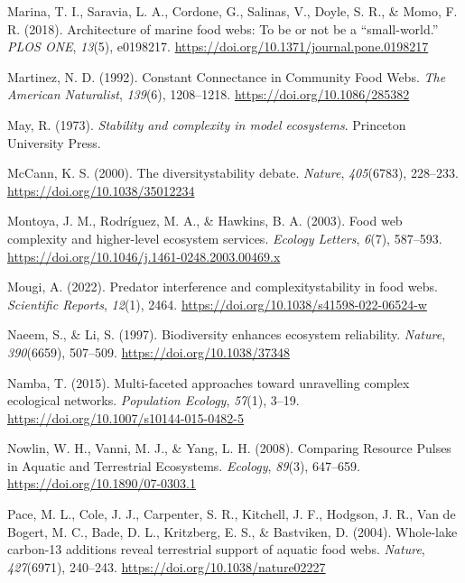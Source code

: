 \documentclass[
]{article}
\newlength{\cslhangindent}
\newlength{\cslentryspacingunit} %
\newenvironment{CSLReferences}[2] %
 {%
  \setlength{\parindent}{0pt}
  \ifodd #1
  \let\oldpar\par
  \def\par{\hangindent=\cslhangindent\oldpar}
  \fi
  \setlength{\parskip}{#2\cslentryspacingunit}
 }%
 {}
\begin{document}
\begin{CSLReferences}{1}{0}
\leavevmode{}%
Marina, T. I., Saravia, L. A., Cordone, G., Salinas, V., Doyle, S. R.,
\& Momo, F. R. (2018). Architecture of marine food webs: {To} be or not
be a {``small-world.''} \emph{PLOS ONE}, \emph{13}(5), e0198217.
\url{https://doi.org/10.1371/journal.pone.0198217}

\leavevmode{}%
Martinez, N. D. (1992). Constant {Connectance} in {Community Food Webs}.
\emph{The American Naturalist}, \emph{139}(6), 1208--1218.
\url{https://doi.org/10.1086/285382}

\leavevmode{}%
May, R. (1973). \emph{Stability and complexity in model ecosystems}.
{Princeton University Press}.

\leavevmode{}%
McCann, K. S. (2000). The diversity\textendash stability debate.
\emph{Nature}, \emph{405}(6783), 228--233.
\url{https://doi.org/10.1038/35012234}

\leavevmode{}%
Montoya, J. M., Rodríguez, M. A., \& Hawkins, B. A. (2003). Food web
complexity and higher-level ecosystem services. \emph{Ecology Letters},
\emph{6}(7), 587--593.
\url{https://doi.org/10.1046/j.1461-0248.2003.00469.x}

\leavevmode{}%
Mougi, A. (2022). Predator interference and
complexity\textendash stability in food webs. \emph{Scientific Reports},
\emph{12}(1), 2464. \url{https://doi.org/10.1038/s41598-022-06524-w}

\leavevmode{}%
Naeem, S., \& Li, S. (1997). Biodiversity enhances ecosystem
reliability. \emph{Nature}, \emph{390}(6659), 507--509.
\url{https://doi.org/10.1038/37348}

\leavevmode{}%
Namba, T. (2015). Multi-faceted approaches toward unravelling complex
ecological networks. \emph{Population Ecology}, \emph{57}(1), 3--19.
\url{https://doi.org/10.1007/s10144-015-0482-5}

\leavevmode{}%
Nowlin, W. H., Vanni, M. J., \& Yang, L. H. (2008). Comparing {Resource
Pulses} in {Aquatic} and {Terrestrial Ecosystems}. \emph{Ecology},
\emph{89}(3), 647--659. \url{https://doi.org/10.1890/07-0303.1}

\leavevmode{}%
Pace, M. L., Cole, J. J., Carpenter, S. R., Kitchell, J. F., Hodgson, J.
R., Van de Bogert, M. C., Bade, D. L., Kritzberg, E. S., \& Bastviken,
D. (2004). Whole-lake carbon-13 additions reveal terrestrial support of
aquatic food webs. \emph{Nature}, \emph{427}(6971), 240--243.
\url{https://doi.org/10.1038/nature02227}


\end{CSLReferences}
\end{document}
